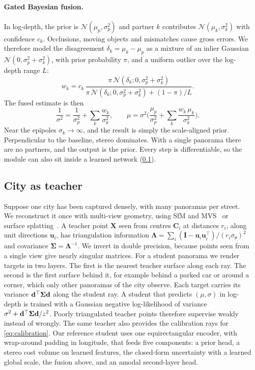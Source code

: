 \paragraph{Gated Bayesian fusion.}
In log-depth, the prior is $\mathcal{N}(\mu_p,\sigma_p^2)$ and partner $k$ contributes
$\mathcal{N}(\mu_k,\sigma_k^2)$ with confidence $c_k$. Occlusions, moving objects and mismatches cause
gross errors. We therefore model the disagreement $\delta_k=\mu_k-\mu_p$ as a mixture of an inlier
Gaussian $\mathcal{N}(0,\sigma_p^2+\sigma_k^2)$, with prior probability $\pi$, and a uniform outlier
over the log-depth range $L$:
\begin{equation}
  w_k = c_k\,\frac{\pi\,\mathcal{N}(\delta_k;0,\sigma_p^2+\sigma_k^2)}
  {\pi\,\mathcal{N}(\delta_k;0,\sigma_p^2+\sigma_k^2)+(1-\pi)/L}.
\end{equation}
The fused estimate is then
\begin{equation}
  \frac{1}{\sigma^2}=\frac{1}{\sigma_p^2}+\sum_k\frac{w_k}{\sigma_k^2},\qquad
  \mu=\sigma^2\Big(\frac{\mu_p}{\sigma_p^2}+\sum_k\frac{w_k\,\mu_k}{\sigma_k^2}\Big).
\end{equation}
Near the epipoles $\sigma_k\to\infty$, and the result is simply the scale-aligned prior. Perpendicular
to the baseline, stereo dominates. With a single panorama there are no partners, and the output is the
prior. Every step is differentiable, so the module can also sit inside a learned network
(\cref{sec:teacher}).

\subsection{City as teacher}
\label{sec:teacher}

Suppose one city has been captured densely, with many panoramas per street. We reconstruct it once with
multi-view geometry, using SfM and MVS~\cite{schoenberger2016sfm,schoenberger2016mvs} or surface
splatting~\cite{huang2024twodgs}. A teacher point $\mathbf{X}$ seen from centres $\mathbf{C}_i$ at
distances $r_i$, along unit directions $\mathbf{u}_i$, has triangulation information
$\boldsymbol{\Lambda}=\sum_i(\mathbf{I}-\mathbf{u}_i\mathbf{u}_i^\top)/(r_i\sigma_\theta)^2$ and
covariance $\boldsymbol{\Sigma}=\boldsymbol{\Lambda}^{-1}$. We invert in double precision, because
points seen from a single view give nearly singular matrices. For a student panorama we render targets
in two layers. The first is the nearest teacher surface along each ray. The second is the first surface
behind it, for example behind a parked car or around a corner, which only other panoramas of the city
observe. Each target carries its variance $\mathbf{d}^\top\boldsymbol{\Sigma}\mathbf{d}$ along the student ray.
A student that predicts $(\mu,\sigma)$ in log-depth is trained with a Gaussian negative log-likelihood
of variance $\sigma^2+\mathbf{d}^\top\boldsymbol{\Sigma}\mathbf{d}/z^2$. Poorly triangulated teacher points
therefore supervise weakly instead of wrongly. The same teacher also provides the calibration rays for
\cref{eq:calibration}. Our reference student uses one equirectangular encoder, with wrap-around padding
in longitude, that feeds five components: a prior head, a stereo cost volume on learned features, the
closed-form uncertainty with a learned global scale, the fusion above, and an amodal second-layer head.
